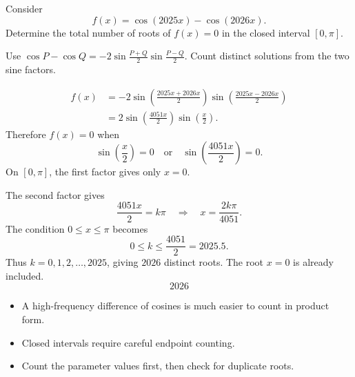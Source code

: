 \begin{problem}
Consider
\[
f(x)=\cos(2025x)-\cos(2026x).
\]
Determine the total number of roots of $f(x)=0$ in the closed interval
$[0,\pi]$.
\end{problem}

\begin{hintbox}
Use $\cos P-\cos Q=-2\sin\frac{P+Q}{2}\sin\frac{P-Q}{2}$. Count distinct
solutions from the two sine factors.
\end{hintbox}

\begin{solution}
\[
\begin{aligned}
f(x)
&=-2\sin\left(\frac{2025x+2026x}{2}\right)
       \sin\left(\frac{2025x-2026x}{2}\right)\\
&=2\sin\left(\frac{4051x}{2}\right)\sin\left(\frac{x}{2}\right).
\end{aligned}
\]
Therefore $f(x)=0$ when
\[
\sin\left(\frac{x}{2}\right)=0
\quad\text{or}\quad
\sin\left(\frac{4051x}{2}\right)=0.
\]
On $[0,\pi]$, the first factor gives only $x=0$.

The second factor gives
\[
\frac{4051x}{2}=k\pi
\quad\Longrightarrow\quad
x=\frac{2k\pi}{4051}.
\]
The condition $0\le x\le\pi$ becomes
\[
0\le k\le \frac{4051}{2}=2025.5.
\]
Thus $k=0,1,2,\ldots,2025$, giving $2026$ distinct roots. The root $x=0$ is
already included.
\[
\boxed{2026}
\]
\end{solution}

\begin{takeaways}
\begin{itemize}[leftmargin=*]
  \item A high-frequency difference of cosines is much easier to count in
        product form.
  \item Closed intervals require careful endpoint counting.
  \item Count the parameter values first, then check for duplicate roots.
\end{itemize}
\end{takeaways}

